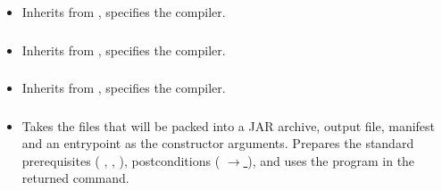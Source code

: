 \begin{itemize}[label={}]
    \item Inherits from \hyperref[subsec:CompileBase]{}, specifies the  compiler.
\end{itemize}

\subsubsection*{}\label{subsec:CompileHaskell}

\begin{itemize}[label={}]
    \item Inherits from \hyperref[subsec:CompileBase]{}, specifies the  compiler.
\end{itemize}

\subsubsection*{}\label{subsec:CompileJava}

\begin{itemize}[label={}]
    \item Inherits from \hyperref[subsec:CompileBase]{}, specifies the  compiler.
\end{itemize}

\subsubsection*{}\label{subsec:CreateJar}

\begin{itemize}[label={}]
    \item Takes the files that will be packed into a JAR archive, output file, manifest and an entrypoint as the
          constructor arguments.
          Prepares the standard prerequisites (
          \hyperref[subsec:ProgramExistsPrerequisite]{},
          \hyperref[subsec:FileExistsPrerequisite]{},
          \hyperref[subsec:NonEmptyListPrerequisite]{}
          ), postconditions (
          \hyperref[subsec:ExitCodePostcondition]{ $\rightarrow$ }
          ), and uses the  program in the returned command.
\end{itemize}

